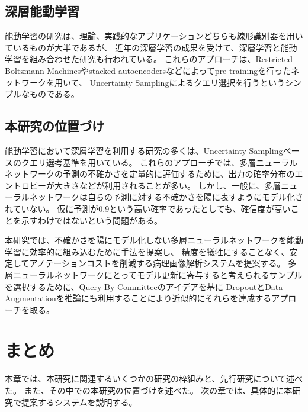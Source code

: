 \subsection{深層能動学習}
能動学習の研究は、理論、実践的なアプリケーションどちらも線形識別器を用いているものが大半であるが、
近年の深層学習の成果を受けて、深層学習と能動学習を組み合わせた研究も行われている\cite{6889457, li2016active}。
これらのアプローチは、Restricted Boltzmann Machinesやstacked autoencodersなどによってpre-trainingを行ったネットワークを用いて、
Uncertainty Samplingによるクエリ選択を行うというシンプルなものである。

\subsection{本研究の位置づけ}
能動学習において深層学習を利用する研究の多くは、Uncertainty Samplingベースのクエリ選考基準を用いている。
これらのアプローチでは、多層ニューラルネットワークの予測の不確かさを定量的に評価するために、出力の確率分布のエントロピーが大きさなどが利用されることが多い。
しかし、一般に、多層ニューラルネットワークは自らの予測に対する不確かさを陽に表すようにモデル化されていない。
仮に予測が0.9という高い確率であったとしても、確信度が高いことを示すわけではないという問題がある。

本研究では、不確かさを陽にモデル化しない多層ニューラルネットワークを能動学習に効率的に組み込むために手法を提案し、
精度を犠牲にすることなく、安定してアノテーションコストを削減する病理画像解析システムを提案する。
多層ニューラルネットワークにとってモデル更新に寄与すると考えられるサンプルを選択するために、Query-By-Committeeのアイデアを基に
DropoutとData Augmentationを推論にも利用することにより近似的にそれらを達成するアプローチを取る。

\section{まとめ}
本章では、本研究に関連するいくつかの研究の枠組みと、先行研究について述べた。
また、その中での本研究の位置づけを述べた。
次の章では、具体的に本研究で提案するシステムを説明する。
